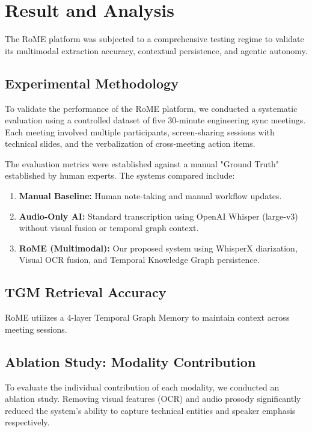 \chapter{Result and Analysis}
\noindent
The RoME platform was subjected to a comprehensive testing regime to validate its multimodal extraction accuracy, contextual persistence, and agentic autonomy.

\section{Experimental Methodology}
To validate the performance of the RoME platform, we conducted a systematic evaluation using a controlled dataset of five 30-minute engineering sync meetings. Each meeting involved multiple participants, screen-sharing sessions with technical slides, and the verbalization of cross-meeting action items. 

The evaluation metrics were established against a manual "Ground Truth" established by human experts. The systems compared include:
\begin{enumerate}
    \item \textbf{Manual Baseline:} Human note-taking and manual workflow updates.
    \item \textbf{Audio-Only AI:} Standard transcription using OpenAI Whisper (large-v3) without visual fusion or temporal graph context.
    \item \textbf{RoME (Multimodal):} Our proposed system using WhisperX diarization, Visual OCR fusion, and Temporal Knowledge Graph persistence.
\end{enumerate}

\section{TGM Retrieval Accuracy}
RoME utilizes a 4-layer Temporal Graph Memory to maintain context across meeting sessions.

\section{Ablation Study: Modality Contribution}
To evaluate the individual contribution of each modality, we conducted an ablation study. Removing visual features (OCR) and audio prosody significantly reduced the system's ability to capture technical entities and speaker emphasis respectively.

